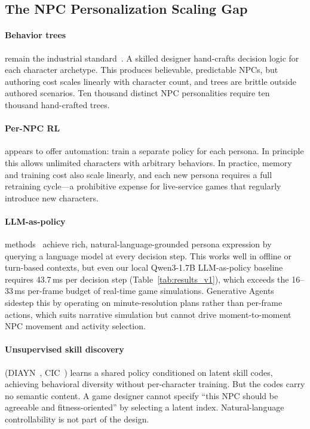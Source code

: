 \documentclass[conference]{IEEEtran}
\begin{document}
\subsection{The NPC Personalization Scaling Gap}

\paragraph{Behavior trees} remain the industrial standard~\cite{yannakakis2018ai}.
A skilled designer hand-crafts decision logic for each character archetype.
This produces believable, predictable NPCs, but authoring cost scales linearly
with character count, and trees are brittle outside authored scenarios.
Ten thousand distinct NPC personalities require ten thousand hand-crafted trees.

\paragraph{Per-NPC RL} appears to offer automation: train a separate policy for
each persona. In principle this allows unlimited characters with arbitrary
behaviors. In practice, memory and training cost also scale linearly, and each
new persona requires a full retraining cycle---a prohibitive expense for
live-service games that regularly introduce new characters.

\paragraph{LLM-as-policy} methods~\cite{park2023generative,wang2023voyager,yao2023react}
achieve rich, natural-language-grounded persona expression by querying a language
model at every decision step. This works well in offline or turn-based contexts,
but even our local Qwen3-1.7B LLM-as-policy baseline requires 43.7\,ms per
decision step (Table~\ref{tab:results_v1}),
which exceeds the 16--33\,ms per-frame budget of real-time game simulations.
Generative Agents~\cite{park2023generative} sidestep this by operating on
minute-resolution plans rather than per-frame actions, which suits narrative
simulation but cannot drive moment-to-moment NPC movement and activity selection.

\paragraph{Unsupervised skill discovery} (DIAYN~\cite{eysenbach2018diayn},
CIC~\cite{laskin2022cic}) learns a shared policy conditioned on latent skill codes,
achieving behavioral diversity without per-character training. But the codes carry
no semantic content. A game designer cannot specify ``this NPC should be agreeable
and fitness-oriented'' by selecting a latent index.
Natural-language controllability is not part of the design.
\end{document}
